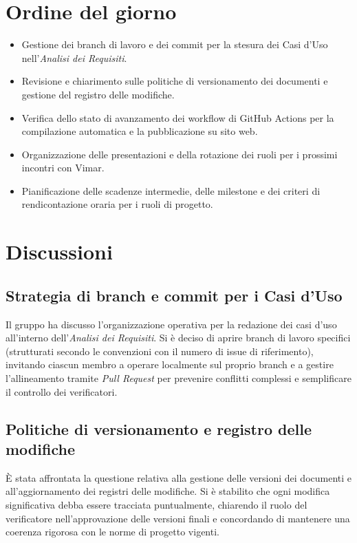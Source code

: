 \documentclass[11pt, a4paper]{article}
\begin{document}
\section{Ordine del giorno}
\begin{itemize}
    \item Gestione dei branch di lavoro e dei commit per la stesura dei Casi d'Uso nell'\textit{Analisi dei Requisiti}.
    \item Revisione e chiarimento sulle politiche di versionamento dei documenti e gestione del registro delle modifiche.
    \item Verifica dello stato di avanzamento dei workflow di GitHub Actions per la compilazione automatica e la pubblicazione su sito web.
    \item Organizzazione delle presentazioni e della rotazione dei ruoli per i prossimi incontri con Vimar.
    \item Pianificazione delle scadenze intermedie, delle milestone e dei criteri di rendicontazione oraria per i ruoli di progetto.
\end{itemize}

\newpage

\section{Discussioni}

\subsection{Strategia di branch e commit per i Casi d'Uso}
Il gruppo ha discusso l'organizzazione operativa per la redazione dei casi d'uso all'interno dell'\textit{Analisi dei Requisiti}. Si è deciso di aprire branch di lavoro specifici (strutturati secondo le convenzioni con il numero di issue di riferimento), invitando ciascun membro a operare localmente sul proprio branch e a gestire l'allineamento tramite \textit{Pull Request} per prevenire conflitti complessi e semplificare il controllo dei verificatori.

\subsection{Politiche di versionamento e registro delle modifiche}
È stata affrontata la questione relativa alla gestione delle versioni dei documenti e all'aggiornamento dei registri delle modifiche. Si è stabilito che ogni modifica significativa debba essere tracciata puntualmente, chiarendo il ruolo del verificatore nell'approvazione delle versioni finali e concordando di mantenere una coerenza rigorosa con le norme di progetto vigenti.
\end{document}
